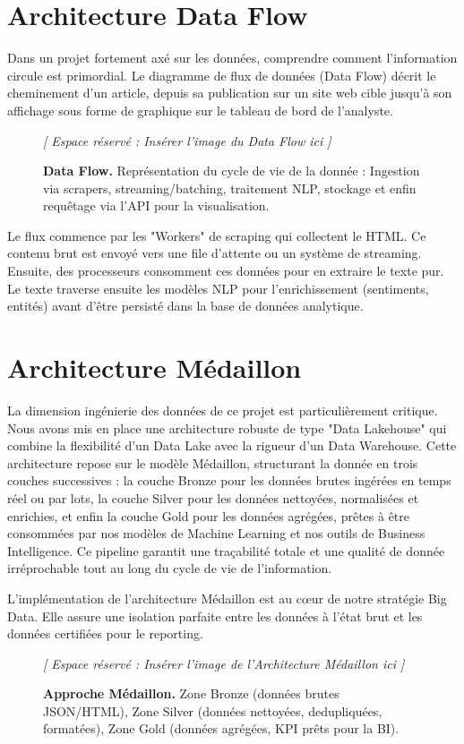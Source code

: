 \documentclass[12pt,a4paper,oneside]{report}
\newcommand{\texteDataEng}{
La dimension ingénierie des données de ce projet est particulièrement critique. Nous avons mis en place une architecture robuste de type "Data Lakehouse" qui combine la flexibilité d'un Data Lake avec la rigueur d'un Data Warehouse. Cette architecture repose sur le modèle Médaillon, structurant la donnée en trois couches successives : la couche Bronze pour les données brutes ingérées en temps réel ou par lots, la couche Silver pour les données nettoyées, normalisées et enrichies, et enfin la couche Gold pour les données agrégées, prêtes à être consommées par nos modèles de Machine Learning et nos outils de Business Intelligence. Ce pipeline garantit une traçabilité totale et une qualité de donnée irréprochable tout au long du cycle de vie de l'information.
}
\begin{document}
\section{Architecture Data Flow}
Dans un projet fortement axé sur les données, comprendre comment l'information circule est primordial. Le diagramme de flux de données (Data Flow) décrit le cheminement d'un article, depuis sa publication sur un site web cible jusqu'à son affichage sous forme de graphique sur le tableau de bord de l'analyste.

\begin{figure}[H]
    \centering
    \begin{figbox}
        \vspace{6cm}
        \textcolor{textgray}{\Large \textit{[ Espace réservé : Insérer l'image du Data Flow ici ]}}
        \vspace{6cm}
    \end{figbox}
    \caption{\textbf{Data Flow.} Représentation du cycle de vie de la donnée : Ingestion via scrapers, streaming/batching, traitement NLP, stockage et enfin requêtage via l'API pour la visualisation.}
    \label{fig:data_flow}
\end{figure}

Le flux commence par les "Workers" de scraping qui collectent le HTML. Ce contenu brut est envoyé vers une file d'attente ou un système de streaming. Ensuite, des processeurs consomment ces données pour en extraire le texte pur. Le texte traverse ensuite les modèles NLP pour l'enrichissement (sentiments, entités) avant d'être persisté dans la base de données analytique.

\section{Architecture Médaillon}
\texteDataEng

L'implémentation de l'architecture Médaillon est au cœur de notre stratégie Big Data. Elle assure une isolation parfaite entre les données à l'état brut et les données certifiées pour le reporting.

\begin{figure}[H]
    \centering
    \begin{figbox}
        \vspace{6cm}
        \textcolor{textgray}{\Large \textit{[ Espace réservé : Insérer l'image de l'Architecture Médaillon ici ]}}
        \vspace{6cm}
    \end{figbox}
    \caption{\textbf{Approche Médaillon.} Zone Bronze (données brutes JSON/HTML), Zone Silver (données nettoyées, dedupliquées, formatées), Zone Gold (données agrégées, KPI prêts pour la BI).}
    \label{fig:medaillon}
\end{figure}
\end{document}
